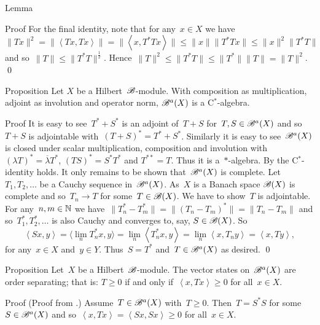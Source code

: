 \documentclass[b]{subfiles}
\begin{document}
\begin{parsec}
\begin{point}{Lemma}
\begin{point}{Proof}
For the final identity, note that for any~$x \in X$ we have
\begin{equation*}
\|Tx\|^2 = \|\left<Tx,Tx\right>\| 
            = \| \left<x, T^*Tx\right>\|
            \leq \|x \| \|T^*Tx \|
            \leq \|x\|^2 \|T^*T\|
\end{equation*}
and so~$\|T\| \leq \|T^*T\|^{\frac{1}{2}}$.
Hence~$\|T\|^2 \leq \|T^*T\| \leq \|T^*\|\|T\| = \|T\|^2$.
    \qed
\end{point}
\end{point}
\begin{point}{Proposition}%
Let $X$ be a Hilbert~$\mathscr{B}$-module.
With composition as multiplication,
    adjoint as involution
    and operator norm,
     $\mathscr{B}^a(X)$ is a C$^*$-algebra.
\begin{point}{Proof}
It is easy to see~$T^*+S^*$ is an adjoint of~$T+S$
    for~$T,S \in \mathscr{B}^a(X)$
    and so~$T+S$ is adjointable with~$(T+S)^* = T^*+ S^*$.
    Similarly it is easy to see~$\mathscr{B}^a(X)$
        is closed under scalar multiplication, composition and involution
        with~$(\lambda T)^* = \overline{\lambda} T^* $,
            $(TS)^* = S^*T^*$ and
            $T^{**} =T$.
Thus it is a~$*$-algebra.
By  
    the C$^*$-identity holds.
It only remains to be shown that~$\mathscr{B}^a(X)$ is complete.
Let~$T_1,T_2,\ldots$ be a Cauchy sequence in~$\mathscr{B}^a(X)$.
As~$X$ is a Banach space $\mathscr{B}(X)$ is complete
    and so~$T_n \to T$ for some~$T \in \mathscr{B}(X)$.
We have to show~$T$ is adjointable.
For any~$n,m \in \mathbb{N}$ we have~$\|T_n^* - T_m^*\|
= \|(T_n - T_m)^*\| = \|T_n - T_m\|$
and so~$T^*_1, T^*_2,\ldots$
is also Cauchy
and converges to, say, $S \in \mathscr{B}(X)$.
So
\begin{equation*}
\left<S x, y\right> =
\langle\lim_{n} T^*_n x, y\rangle = \lim_n \left<T_n^* x, y\right>
                = \lim_n \left<x, T_n y\right>
                =  \left<x, T y\right>,
\end{equation*}
for any~$x \in X$ and~$y \in Y$.
Thus~$S = T^*$ and~$T \in \mathscr{B}^a(X)$ as desired. \qed
\end{point}
\end{point}
\begin{point}{Proposition}%
Let~$X$ be a Hilbert~$\mathscr{B}$-module.
The vector states on~$\mathscr{B}^a(X)$ are order separating;
that is: $T \geq 0$ if and only if~$\left<x,Tx\right> \geq 0$
for all~$x \in X$.
\begin{point}{Proof}%
(Proof from \cite[Lemma 4.1]{lance}.)
Assume~$T \in \mathscr{B}^a(X)$ with~$T \geq 0$.
Then~$T = S^*S$ for some~$S \in \mathscr{B}^a(X)$
    and so~$\left<x, Tx\right> = \left<Sx,Sx\right> \geq 0$
    for all~$x \in X$.


\end{point}
\end{point}
\end{parsec}
\end{document}
